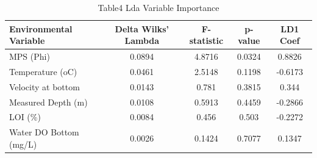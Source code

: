 
\begin{table}[htbp]
    \centering
    \small
    \caption{Table4 Lda Variable Importance}
    \label{tab:table4_lda_variable_importance}
    \begin{tabular}{lcccc}
        \toprule
        Environmental Variable & Delta Wilks' Lambda & F-statistic & p-value & LD1 Coef \\
        \midrule
        MPS (Phi) & 0.0894 & 4.8716 & 0.0324 & 0.8826 \\
        Temperature (oC) & 0.0461 & 2.5148 & 0.1198 & -0.6173 \\
        Velocity  at bottom & 0.0143 & 0.781 & 0.3815 & 0.344 \\
        Measured Depth (m) & 0.0108 & 0.5913 & 0.4459 & -0.2866 \\
        LOI (\%) & 0.0084 & 0.456 & 0.503 & -0.2272 \\
        Water DO Bottom (mg/L) & 0.0026 & 0.1424 & 0.7077 & 0.1347 \\
        \bottomrule
    \end{tabular}
\end{table}
